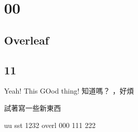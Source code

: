 
\chapter{00}
\section{Overleaf}
\section{11}

Yeah!
This
GOod thing! 知道嗎？
，好煩

試著寫一些新東西


uu
sst
1232
overl
000
111
222